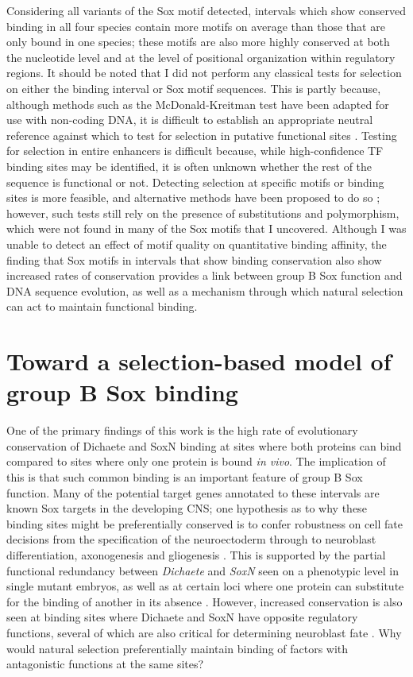 Considering all variants of the Sox motif detected, intervals which show conserved binding in all four species contain more motifs on average than those that are only bound in one species; these motifs are also more highly conserved at both the nucleotide level and at the level of positional organization within regulatory regions. It should be noted that I did not perform any classical tests for selection on either the binding interval or Sox motif sequences. This is partly because, although methods such as the McDonald-Kreitman test have been adapted for use with non-coding DNA, it is difficult to establish an appropriate neutral reference against which to test for selection in putative functional sites \citep{anisimova_methods_2012}. Testing for selection in entire enhancers is difficult because, while high-confidence TF binding sites may be identified, it is often unknown whether the rest of the sequence is functional or not. Detecting selection at specific motifs or binding sites is more feasible, and alternative methods have been proposed to do so \citep{moses_statistical_2009}; however, such tests still rely on the presence of substitutions and polymorphism, which were not found in many of the Sox motifs that I uncovered. Although I was unable to detect an effect of motif quality on quantitative binding affinity, the finding that Sox motifs in intervals that show binding conservation also show increased rates of conservation provides a link between group B Sox function and DNA sequence evolution, as well as a mechanism through which natural selection can act to maintain functional binding.  

\section{Toward a selection-based model of group B Sox binding}
One of the primary findings of this work is the high rate of evolutionary conservation of Dichaete and SoxN binding at sites where both proteins can bind compared to sites where only one protein is bound \emph{in vivo}. The implication of this is that such common binding is an important feature of group B Sox function. Many of the potential target genes annotated to these intervals are known Sox targets in the developing CNS; one hypothesis as to why these binding sites might be preferentially conserved is to confer robustness on cell fate decisions from the specification of the neuroectoderm through to neuroblast differentiation, axonogenesis and gliogenesis \citep{ferrero_soxneuro_2014,wagner_distributed_2005,wagner_gene_2008}. This is supported by the partial functional redundancy between \emph{Dichaete} and \emph{SoxN} seen on a phenotypic level in single mutant embryos, as well as at certain loci where one protein can substitute for the binding of another in its absence \citep{ferrero_soxneuro_2014,overton_evidence_2002}. However, increased conservation is also seen at binding sites where Dichaete and SoxN have opposite regulatory functions, several of which are also critical for determining neuroblast fate \citep{aleksic_role_2013,ferrero_soxneuro_2014,overton_evidence_2002}. Why would natural selection preferentially maintain binding of factors with antagonistic functions at the same sites?

